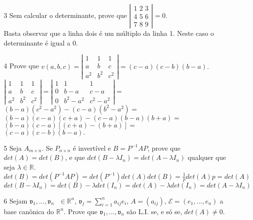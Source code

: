 \documentclass[a4paper]{article}
\begin{document}
\begin{itemize}
\item[3] Sem calcular o determinante, prove que 
$ \left \vert
\begin{array}{lll}
\displaystyle \text{1 2 3} \\
\displaystyle \text{4 5 6} \\
\displaystyle \text{7 8 9}
\end{array}
\right \vert = 0.
$
\\ \textcolor[rgb]{0,0,1}{Basta observar que a linha dois é um múltiplo da linha 1. Neste caso o determinante é igual a 0.}
\item[4] Prove que
$ v(a,b,c) = \left \vert
\begin{array}{lll}
\displaystyle 1&1&1 \\
\displaystyle a&b&c \\
\displaystyle a^2&b^2&c^2
\end{array}
\right \vert = (c-a)(c-b)(b-a).
$
\\ \textcolor[rgb]{0,0,1}{
$
\left \vert
\begin{array}{lll}
\displaystyle 1&1&1 \\
\displaystyle a&b&c \\
\displaystyle a^2&b^2&c^2
\end{array}
\right \vert = \left \vert
\begin{array}{lll}
\displaystyle 1&1&1 \\
\displaystyle 0&b-a&c-a \\
\displaystyle 0&b^2-a^2&c^2-a^2
\end{array}
\right \vert = $
\\
$(b-a)(c^2-a^2)-(c-a)(b^2-a^2) = $
\\
$(b-a)(c-a)(c+a)-(c-a)(b-a)(b+a) = $
\\
$(b-a)(c-a)[(c+a)-(b+a)] = $
\\
$(c-a)(c-b)(b-a).
$
}

\item[5] Seja $A_{m\times n}$. Se $P_{n\times n}$ é invertível e $B=P^{-1}AP$, prove que $det(A)=det(B)$, e que $det(B-\lambda I_n)=det(A-\lambda I_n)$ qualquer que seja $\lambda \in \mathbb{R}$.
\\ \textcolor[rgb]{0,0,1}{
$det(B)=det(P^{-1}AP)=det(P^{-1})det(A)det(B)=\frac{1}{p}det(A)p=det(A)$
\\
$det(B-\lambda I_n)=det(B)-\lambda det(I_n)=det(A)-\lambda det(I_n)=det(A-\lambda I_n)$
}

\item[6] Sejam $\mathfrak{v}_1,...,\mathfrak{v}_n\text{ }\in \mathbb{R}^n$, $\mathfrak{v}_j=\sum_{i=1}^n a_{ij}e_i$, $A=(a_{ij})$, $\mathcal{E}=(e_1,...,e_n)$ a base canônica do $\mathbb{R}^n$. Prove que $\mathfrak{v}_1,...,\mathfrak{v}_n$ são L.I. se, e só se, $det(A)\neq0$.


\end{itemize}
\end{document}
